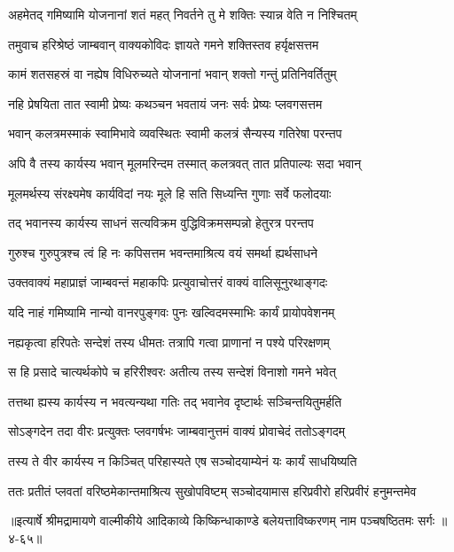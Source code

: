 \twolineshloka
{अहमेतद् गमिष्यामि योजनानां शतं महत्}
{निवर्तने तु मे शक्तिः स्यान्न वेति न निश्चितम्} %

\twolineshloka
{तमुवाच हरिश्रेष्ठं जाम्बवान् वाक्यकोविदः}
{ज्ञायते गमने शक्तिस्तव हर्यृक्षसत्तम} %

\twolineshloka
{कामं शतसहस्रं वा नह्येष विधिरुच्यते}
{योजनानां भवान् शक्तो गन्तुं प्रतिनिवर्तितुम्} %

\twolineshloka
{नहि प्रेषयिता तात स्वामी प्रेष्यः कथञ्चन}
{भवतायं जनः सर्वः प्रेष्यः प्लवगसत्तम} %

\twolineshloka
{भवान् कलत्रमस्माकं स्वामिभावे व्यवस्थितः}
{स्वामी कलत्रं सैन्यस्य गतिरेषा परन्तप} %

\twolineshloka
{अपि वै तस्य कार्यस्य भवान् मूलमरिन्दम}
{तस्मात् कलत्रवत् तात प्रतिपाल्यः सदा भवान्} %

\twolineshloka
{मूलमर्थस्य संरक्ष्यमेष कार्यविदां नयः}
{मूले हि सति सिध्यन्ति गुणाः सर्वे फलोदयाः} %

\twolineshloka
{तद् भवानस्य कार्यस्य साधनं सत्यविक्रम}
{वुद्धिविक्रमसम्पन्नो हेतुरत्र परन्तप} %

\twolineshloka
{गुरुश्च गुरुपुत्रश्च त्वं हि नः कपिसत्तम}
{भवन्तमाश्रित्य वयं समर्था ह्यर्थसाधने} %

\twolineshloka
{उक्तवाक्यं महाप्राज्ञं जाम्बवन्तं महाकपिः}
{प्रत्युवाचोत्तरं वाक्यं वालिसूनुरथाङ्गदः} %

\twolineshloka
{यदि नाहं गमिष्यामि नान्यो वानरपुङ्गवः}
{पुनः खल्विदमस्माभिः कार्यं प्रायोपवेशनम्} %

\twolineshloka
{नह्यकृत्वा हरिपतेः सन्देशं तस्य धीमतः}
{तत्रापि गत्वा प्राणानां न पश्ये परिरक्षणम्} %

\twolineshloka
{स हि प्रसादे चात्यर्थकोपे च हरिरीश्वरः}
{अतीत्य तस्य सन्देशं विनाशो गमने भवेत्} %

\twolineshloka
{तत्तथा ह्यस्य कार्यस्य न भवत्यन्यथा गतिः}
{तद् भवानेव दृष्टार्थः सञ्चिन्तयितुमर्हति} %

\twolineshloka
{सोऽङ्गदेन तदा वीरः प्रत्युक्तः प्लवगर्षभः}
{जाम्बवानुत्तमं वाक्यं प्रोवाचेदं ततोऽङ्गदम्} %

\twolineshloka
{तस्य ते वीर कार्यस्य न किञ्चित् परिहास्यते}
{एष सञ्चोदयाम्येनं यः कार्यं साधयिष्यति} %

\twolineshloka
{ततः प्रतीतं प्लवतां वरिष्ठमेकान्तमाश्रित्य सुखोपविष्टम्}
{सञ्चोदयामास हरिप्रवीरो हरिप्रवीरं हनुमन्तमेव} %


॥इत्यार्षे श्रीमद्रामायणे वाल्मीकीये आदिकाव्ये किष्किन्धाकाण्डे बलेयत्ताविष्करणम् नाम पञ्चषष्ठितमः सर्गः ॥४-६५॥
